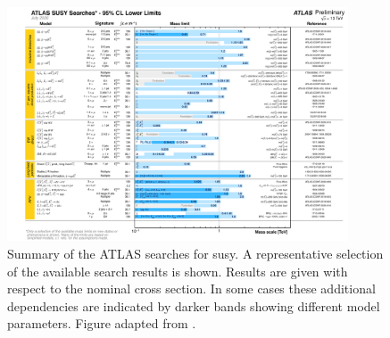 \ifpdf
\graphicspath{{chapter-results/Figs/Raster/}{chapter-results/Figs/PDF/}{chapter-results/Figs/}}
\else
\graphicspath{{chapter-results/Figs/Vector/}{chapter-results/Figs/}}
\fi


\begin{figure}
	\centering\includegraphics[width=0.9\textwidth]{susy_summary}
	\caption{Summary of the ATLAS searches for \gls{susy}. A representative selection of the available search results is shown. Results are given with respect to the nominal cross section. In some cases these additional dependencies are indicated by darker bands showing different model parameters. Figure adapted from \cite{ATL-PHYS-PUB-2020-020}.}
	\label{fig:susy_summary_plot}
\end{figure}

